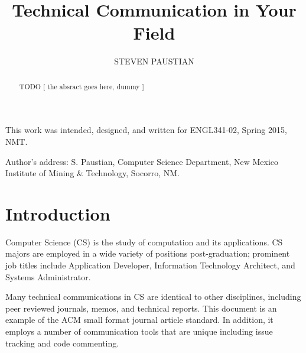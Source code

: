 \documentclass[prodmode,acmtecs]{acmsmall} %
\begin{document}

\title{Technical Communication in Your Field}
\author{STEVEN PAUSTIAN
}

\begin{abstract}
TODO [ the absract goes here, dummy ]
\end{abstract}





\begin{bottomstuff}
This work was intended, designed, and written for ENGL341-02, Spring 2015, NMT.

Author's address: S. Paustian, Computer Science Department,
New Mexico Institute of Mining \& Technology, Socorro, NM.
\end{bottomstuff}

\maketitle


\section{Introduction}
Computer Science (CS) is the study of computation and its applications.  CS majors are employed in a wide variety of positions post-graduation; prominent job titles include Application Developer, Information Technology Architect, and Systems Administrator.\cite{payscale}

Many technical communications in CS are identical to other disciplines, including peer reviewed journals, memos, and technical reports.  This document is an example of the ACM small format journal article standard.\cite{acm}  In addition, it employs a number of communication tools that are unique including issue tracking and code commenting.
\end{document}
